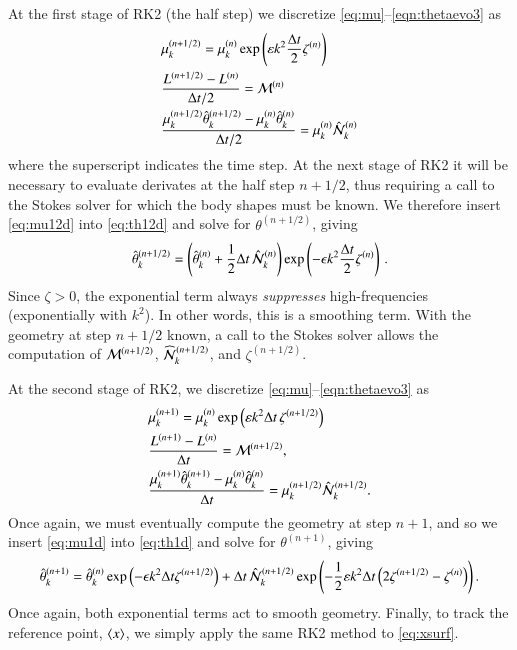 \documentclass[preprint, 10pt]{elsarticle}
\begin{document}
At the first stage of RK2 (the half step) we discretize \eqref{eq:mu}--\eqref{eqn:thetaevo3} as
\begin{align}
\label{eq:mu12d}
& \mu_k^{(n+1/2)} = \mu_k^{(n)} \exp \left( \varepsilon k^2 \frac{\Delta t}{2} \zeta^{(n)} \right) \\
\label{eq:L12d}
& \frac{L^{(n+1/2)} - L^{(n)}}{\Delta t/2} = \mathcal{M}^{(n)} \\
\label{eq:th12d}
& \frac{ \mu_k^{(n+1/2)} \hat{\theta}_k^{(n+1/2)} - \mu_k^{(n)} \hat{\theta}_k^{(n)}}{\Delta t/2} 
= \mu_k^{(n)} \hat{\mathcal{N}}_k^{(n)}
\end{align}
where the superscript indicates the time step. At the next stage of RK2 it will be necessary to evaluate derivates at the half step $n+1/2$, thus requiring a call to the Stokes solver for which the body shapes must be known. We therefore insert \eqref{eq:mu12d} into \eqref{eq:th12d} and solve for $\theta^{(n+1/2)}$, giving
\begin{align}
\label{eq:th12}
\hat{\theta}_k^{(n+1/2)} = \left( \hat{\theta}_k^{(n)} + \frac{1}{2} \Delta t \, \hat{\mathcal{N}}_k^{(n)} \right)
\exp \left( -\epsilon k^2 \frac{\Delta t}{2} \zeta^{(n)}\right) \, .
\end{align}
Since $\zeta >0$, the exponential term always {\em suppresses} high-frequencies (exponentially with $k^2$). In other words, this is a smoothing term. With the geometry at step $n+1/2$ known, a call to the Stokes solver allows the computation of $\mathcal{M}^{(n+1/2)}$, $\widehat{\NLterm}_k^{(n+1/2)}$, and $\zeta^{(n+1/2)}$.

At the second stage of RK2, we discretize \eqref{eq:mu}--\eqref{eqn:thetaevo3} as 
\begin{align}
\label{eq:mu1d}
& \mu_k^{(n+1)} = \mu_k^{(n)} \exp \left( \varepsilon k^2 {\Delta t} \, \zeta^{(n+1/2)} \right) \\
\label{eq:L1d}
& \frac{L^{(n+1)} - L^{(n)}}{\Delta t} = \mathcal{M}^{(n+1/2)}, \\
\label{eq:th1d}
& \frac{ \mu_k^{(n+1)} \hat{\theta}_k^{(n+1)} - \mu_k^{(n)} \hat{\theta}_k^{(n)}}{\Delta t} =
\mu_k^{(n+1/2)} \hat{\mathcal{N}}_k^{(n+1/2)}.
\end{align}
Once again, we must eventually compute the geometry at step $n+1$, and so we insert \eqref{eq:mu1d} into \eqref{eq:th1d} and solve for $\theta^{(n+1)}$, giving
\begin{align}
\hat{\theta}_k^{(n+1)} =  \hat{\theta}_k^{(n)} \exp \left( - \epsilon k^2 \Delta t \zeta^{(n+1/2)} \right) + \Delta t \, \hat{\mathcal{N}}_k^{(n+1/2)} \exp \left( - \frac{1}{2} \varepsilon k^2 \Delta t \left( 2 \zeta^{(n+1/2)} - \zeta^{(n)} \right) \right).
\end{align}
Once again, both exponential terms act to smooth geometry. Finally, to track the reference point, $\left< x \right>$, we simply apply the same RK2 method to \eqref{eq:xsurf}.
\end{document}
